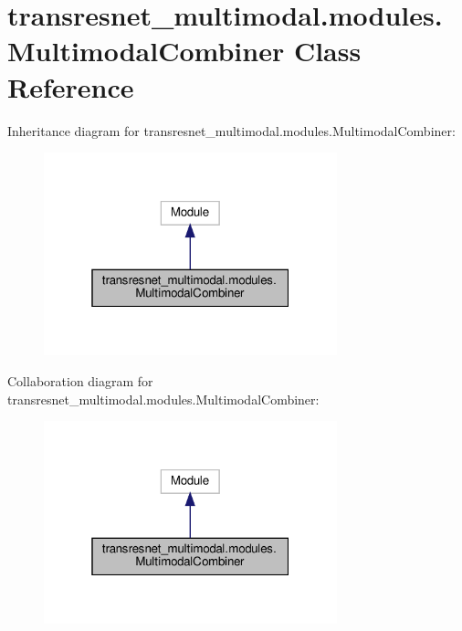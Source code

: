 \hypertarget{classtransresnet__multimodal_1_1modules_1_1MultimodalCombiner}{}\section{transresnet\+\_\+multimodal.\+modules.\+Multimodal\+Combiner Class Reference}
\label{classtransresnet__multimodal_1_1modules_1_1MultimodalCombiner}


Inheritance diagram for transresnet\+\_\+multimodal.\+modules.\+Multimodal\+Combiner\+:
\nopagebreak
\begin{figure}[H]
\begin{center}
\leavevmode
\includegraphics[width=241pt]{classtransresnet__multimodal_1_1modules_1_1MultimodalCombiner__inherit__graph}
\end{center}
\end{figure}


Collaboration diagram for transresnet\+\_\+multimodal.\+modules.\+Multimodal\+Combiner\+:
\nopagebreak
\begin{figure}[H]
\begin{center}
\leavevmode
\includegraphics[width=241pt]{classtransresnet__multimodal_1_1modules_1_1MultimodalCombiner__coll__graph}
\end{center}
\end{figure}
